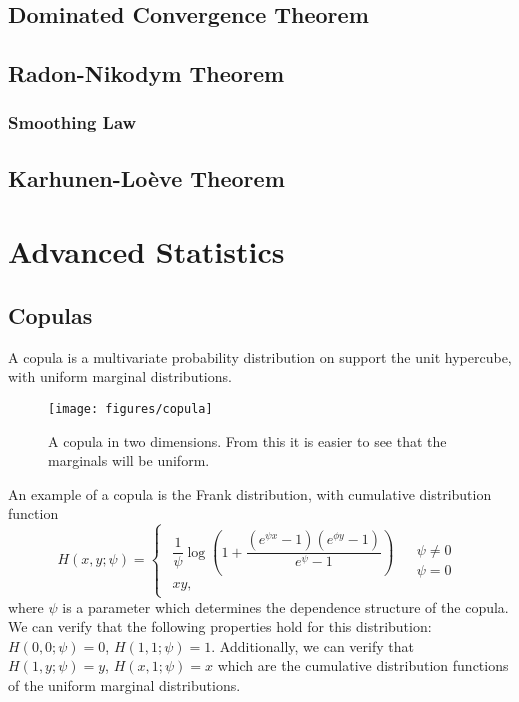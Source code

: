 \documentclass[11pt]{report} %
\begin{document}
\section{Dominated Convergence Theorem}

\section{Radon-Nikodym Theorem}

\subsection{Smoothing Law}

\section{Karhunen-Lo\`eve Theorem}


\chapter{Advanced Statistics}

\section{Copulas}

A copula is a multivariate probability distribution on support the unit hypercube, with uniform marginal distributions. 	

\begin{figure}[H]
\texttt{[image: figures/copula]}\centering
\caption{A copula in two dimensions. From this it is easier to see that the marginals will be uniform.}
\end{figure}

An example of a copula is the Frank distribution, with cumulative distribution function
\begin{equation}
H\left(x, y; \psi\right) = \begin{cases}
\begin{array}{c}
\dfrac{1}{\psi}\log\left(1+\dfrac{\left(e^{\psi x}-1\right)\left(e^{\phi y}-1\right)}{e^{\psi}-1}\right)\\
xy,
\end{array} & \begin{array}{c}
\psi\neq0\\
\psi=0
\end{array}\end{cases}
\end{equation}
where $\psi$ is a parameter which determines the dependence structure of the copula. We can verify that the following properties hold for this distribution: $H\left(0, 0; \psi\right) = 0$, $H\left(1, 1; \psi\right) = 1$. Additionally, we can verify that $H\left(1, y; \psi\right) = y$, $H\left(x, 1; \psi\right) = x$ which are the cumulative distribution functions of the uniform marginal distributions. \\
\end{document}
